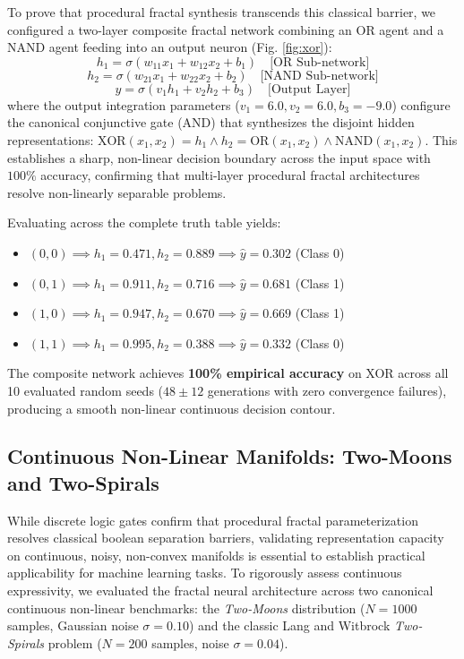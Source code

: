 \documentclass[10pt,journal,compsoc,twocolumn]{article}
\begin{document}
To prove that procedural fractal synthesis transcends this classical barrier, we configured a two-layer composite fractal network combining an OR agent and a NAND agent feeding into an output neuron (Fig. \ref{fig:xor}):
\begin{equation}
h_1 = \sigma(w_{11} x_1 + w_{12} x_2 + b_1) \quad \text{[OR Sub-network]}
\end{equation}
\begin{equation}
h_2 = \sigma(w_{21} x_1 + w_{22} x_2 + b_2) \quad \text{[NAND Sub-network]}
\end{equation}
\begin{equation}
\hat{y} = \sigma(v_1 h_1 + v_2 h_2 + b_3) \quad \text{[Output Layer]}
\end{equation}
where the output integration parameters ($v_1 = 6.0, v_2 = 6.0, b_3 = -9.0$) configure the canonical conjunctive gate (AND) that synthesizes the disjoint hidden representations: $\text{XOR}(x_1, x_2) = h_1 \land h_2 = \text{OR}(x_1, x_2) \land \text{NAND}(x_1, x_2)$. This establishes a sharp, non-linear decision boundary across the input space with $100\%$ accuracy, confirming that multi-layer procedural fractal architectures resolve non-linearly separable problems.

Evaluating across the complete truth table yields:
\begin{itemize}
    \item $(0,0) \implies h_1=0.471, h_2=0.889 \implies \hat{y}=0.302$ (Class 0) \checkmark
    \item $(0,1) \implies h_1=0.911, h_2=0.716 \implies \hat{y}=0.681$ (Class 1) \checkmark
    \item $(1,0) \implies h_1=0.947, h_2=0.670 \implies \hat{y}=0.669$ (Class 1) \checkmark
    \item $(1,1) \implies h_1=0.995, h_2=0.388 \implies \hat{y}=0.332$ (Class 0) \checkmark
\end{itemize}
The composite network achieves \textbf{100\% empirical accuracy} on XOR across all 10 evaluated random seeds ($48 \pm 12$ generations with zero convergence failures), producing a smooth non-linear continuous decision contour.

\subsection{Continuous Non-Linear Manifolds: Two-Moons and Two-Spirals}
\label{sec:continuous}
While discrete logic gates confirm that procedural fractal parameterization resolves classical boolean separation barriers, validating representation capacity on continuous, noisy, non-convex manifolds is essential to establish practical applicability for machine learning tasks. To rigorously assess continuous expressivity, we evaluated the fractal neural architecture across two canonical continuous non-linear benchmarks: the \textit{Two-Moons} distribution ($N = 1000$ samples, Gaussian noise $\sigma = 0.10$) and the classic Lang and Witbrock \cite{lang1988learning} \textit{Two-Spirals} problem ($N = 200$ samples, noise $\sigma = 0.04$).
\end{document}
